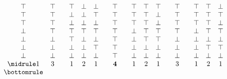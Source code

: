\begin{myproof}
\begin{nlist}[resume]
\begin{gather*}
\begin{array}{c c c c c c c c c c c c c c c c c c c}
                \top & \top &  & \top & \bot & \bot & 
                & \top
                &  & \top & \top & \top & 
                & \top &  & \top & \top & \bot &  \\
                \top & \top &  & \bot & \bot & \top & 
                & \top
                &  & \top & \top & \bot & 
                & \top &  & \top & \top & \top &  \\
                \top & \top &  & \bot & \bot & \bot & 
                & \top
                &  & \top & \top & \bot &
                & \top &  & \top & \top & \bot &  \\
                \bot & \top &  & \top & \top & \top & 
                & \top
                &  & \bot & \top & \top & 
                & \top &  & \bot & \top & \top &  \\
                \bot & \bot &  & \top & \bot & \bot & 
                & \top
                &  & \bot & \top & \top & 
                & \bot &  & \bot & \bot & \bot &  \\
                \bot & \bot &  & \bot & \bot & \top & 
                & \top
                &  & \bot & \bot & \bot & 
                & \bot &  & \bot & \top & \top &  \\
                \bot & \bot &  & \bot & \bot & \bot & 
                & \top
                &  & \bot & \bot & \bot & 
                & \bot &  & \bot & \bot & \bot &  \\
                \midrule
                1 & 3 &  & 1 & 2 & 1 & 
                & \mathbf 4
                &  & 1 & 2 & 1 & 
                & 3 &  & 1 & 2 & 1  & \\
                \bottomrule
            \end{array}
        \end{gather*}


\end{nlist}
\end{myproof}
